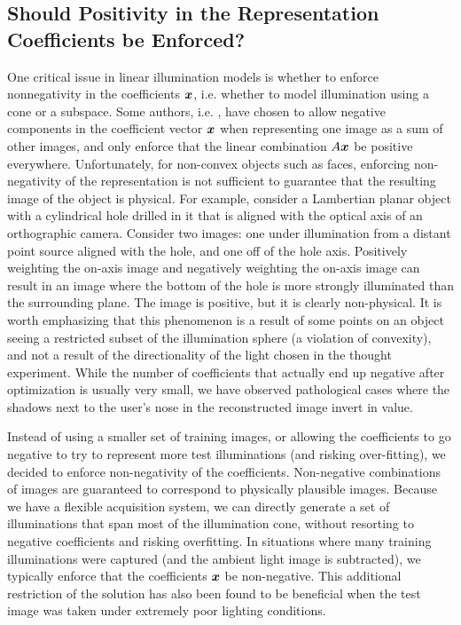 \subsection{Should Positivity in the Representation Coefficients
be Enforced?} 
\label{sec:positivity}
One critical issue in linear illumination models
is whether to enforce nonnegativity in the coefficients ${\boldsymbol{x}}$,
i.e. whether to model illumination using a cone or a subspace.
Some authors, i.e. \cite{Basri2003-PAMI}, have chosen to allow
negative components in the coefficient vector ${\boldsymbol{x}}$ when
representing one image as a sum of other images, and only
enforce that the linear combination $A{\boldsymbol{x}}$ be positive
everywhere.  Unfortunately, for non-convex objects such as
faces, enforcing non-negativity of the representation is not
sufficient to guarantee that the resulting image of the object
is physical.  For example, consider a Lambertian planar object
with a cylindrical hole drilled in it that is aligned with the
optical axis of an orthographic camera.  Consider two images:
one under illumination from a distant point source aligned with
the hole, and one off of the hole axis.  Positively weighting
the on-axis image and negatively weighting the on-axis image
can result in an image where the bottom of the hole is more
strongly illuminated than the surrounding plane.  The image is
positive, but it is clearly non-physical.  It is worth
emphasizing that this phenomenon is a result of some points on
an object seeing a restricted subset of the illumination sphere
(a violation of convexity),  and not a result of the
directionality of the light chosen in the thought experiment.
While the number of coefficients that actually end up negative
after optimization is usually very small, we have observed
pathological cases where the shadows next to the user's nose in
the reconstructed image invert in value.

Instead of using a smaller set of training images, or allowing the coefficients
to go negative to try to represent more test illuminations (and risking
over-fitting), we decided to enforce non-negativity of the coefficients.
Non-negative combinations of images are guaranteed to correspond to physically
plausible images.  Because we have a flexible acquisition system, we can
directly generate a set of illuminations that span most of the illumination
cone, without resorting to negative coefficients and risking overfitting.  In
situations where many training illuminations were captured (and the ambient
light image is subtracted), we typically enforce that the coefficients ${\boldsymbol{x}}$ be
non-negative.  This additional restriction of the solution has also been found
to be beneficial when the test image was taken under extremely poor lighting
conditions.


